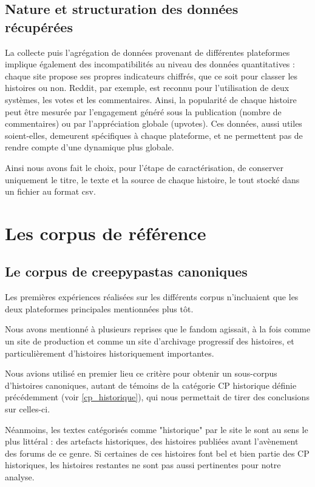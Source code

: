 \documentclass[12pt,a4paper,oneside,titlepage]{book} %
\begin{document}
\section{Nature et structuration des données récupérées}
La collecte puis l'agrégation de données provenant de différentes plateformes implique également des incompatibilités au niveau des données quantitatives : chaque site propose ses propres indicateurs chiffrés, que ce soit pour classer les histoires ou non. Reddit, par exemple, est reconnu pour l'utilisation de deux systèmes, les votes et les commentaires. Ainsi, la popularité de chaque histoire peut être mesurée par l'engagement généré sous la publication (nombre de commentaires) ou par l'appréciation globale (upvotes). Ces données, aussi utiles soient-elles, demeurent spécifiques à chaque plateforme, et ne permettent pas de rendre compte d'une dynamique plus globale.

Ainsi nous avons fait le choix, pour l'étape de caractérisation, de conserver uniquement le titre, le texte et la source de chaque histoire, le tout stocké dans un fichier au format csv. 



\chapter{Les corpus de référence}

\section{Le corpus de creepypastas canoniques}
Les premières expériences réalisées sur les différents corpus n'incluaient que les deux plateformes principales mentionnées plus tôt.

Nous avons mentionné à plusieurs reprises que le fandom agissait, à la fois comme  un site de production et comme un site d'archivage progressif des histoires, et particulièrement d'histoires historiquement importantes. 

Nous avions utilisé en premier lieu ce critère pour obtenir un sous-corpus d'histoires canoniques, autant de témoins de la catégorie \og CP historique \fg{} définie précédemment (voir \ref{cp_historique}), qui nous permettait de tirer des conclusions sur celles-ci.

Néanmoins, les textes catégorisés comme "historique" par le site le sont au sens le plus littéral : des artefacts historiques, des histoires publiées avant l’avènement des forums de ce genre. Si certaines de ces histoires font bel et bien partie des CP historiques, les histoires restantes ne sont pas aussi pertinentes pour notre analyse. 
\end{document}
